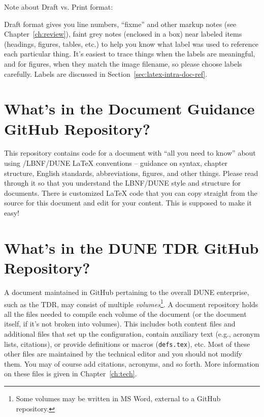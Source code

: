 Note about Draft vs. Print format: 

Draft format gives you line numbers, ``fixme'' and other markup notes (see Chapter~\ref{ch:review}), 
faint grey notes (enclosed in a box) near labeled items (headings, figures, tables, etc.) to help you know 
what label was used to reference each particular thing.  
It's easiest to trace things when the labels are meaningful, and for figures, when they match the image filename, so please choose labels carefully. Labels are discussed in Section~\ref{sec:latex-intra-doc-ref}.

\section{What's in the Document Guidance GitHub Repository?}
\label{sec:gen-guidance-repo}

This repository contains code for a document with ``all you need to know'' about using /LBNF/DUNE \LaTeX{}  conventions  -- guidance on syntax, chapter structure, English standards, abbreviations, figures, and other things. Please read through it so that you understand the LBNF/DUNE style and structure for documents.  There is customized \LaTeX{} code that you can copy straight from the source for this document and edit for your content.  This is supposed to make it easy!


\section{What's in the DUNE TDR GitHub Repository?}
\label{sec:gen-repo}

A document maintained in GitHub pertaining to the overall DUNE enterprise, such as the TDR, may consist of multiple \textit{volumes}\footnote{Some volumes may be written in MS Word, external to a GitHub repository.}.  A document repository holds all the files needed to compile each volume of the document (or the document itself, if it's not broken into volumes). This includes both content files and additional files that set up the configuration, 
contain auxiliary text (e.g., acronym lists, citations), or provide definitions or macros (\texttt{defs.tex}), etc.  Most of these other files are maintained by the technical editor and you should not modify them. You may of course add citations, acronyms, and so forth.   More information on these files is given in Chapter~\ref{ch:tech}.

